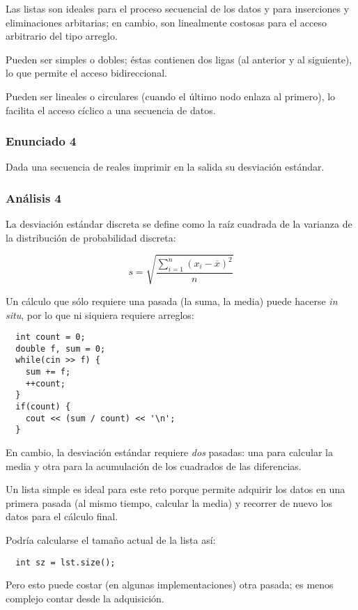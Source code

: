 \documentclass[10pt,letterpaper,twocolumn,spanish]{article}
\begin{document}
Las listas son ideales para el proceso secuencial de los datos y para inserciones y eliminaciones arbitarias; en cambio, son linealmente costosas para el acceso arbitrario del tipo arreglo.

Pueden ser simples o dobles; éstas contienen dos ligas (al anterior y al siguiente), lo que permite el acceso bidireccional.

Pueden ser lineales o circulares (cuando el último nodo enlaza al primero), lo facilita el acceso cíclico a una secuencia de datos.

\subsubsection*{Enunciado 4}

Dada una secuencia de reales imprimir en la salida su desviación estándar.

\subsubsection*{Análisis 4}

La desviación estándar discreta se define como la raíz cuadrada de la varianza de la distribución de probabilidad discreta:

\[s = \sqrt{\frac{\sum_{i=1}^{n}(x_i - \overline{x})^2}{n}}\]

Un cálculo que sólo requiere una pasada (la suma, la media) puede hacerse \textit{in situ}, por lo que ni siquiera requiere arreglos:

\begin{verbatim}
  int count = 0;
  double f, sum = 0;
  while(cin >> f) {
    sum += f;
    ++count;
  }
  if(count) {
    cout << (sum / count) << '\n';
  }
\end{verbatim}

En cambio, la desviación estándar requiere \textit{dos} pasadas: una para calcular la media y otra para la acumulación de los cuadrados de las diferencias.

Un lista simple es ideal para este reto porque permite adquirir los datos en una primera pasada (al mismo tiempo, calcular la media) y recorrer de nuevo los datos para el cálculo final.

Podría calcularse el tamaño actual de la lista así:

\begin{verbatim}
  int sz = lst.size();
\end{verbatim}

Pero esto puede costar (en algunas implementaciones) otra pasada; es menos complejo contar desde la adquisición.
\end{document}

